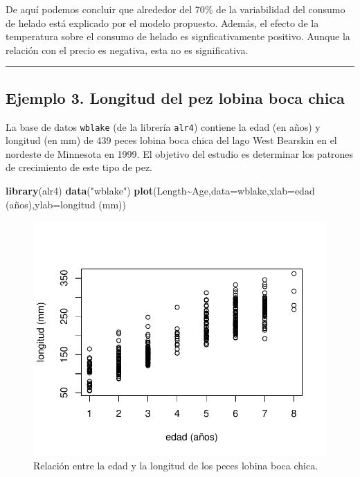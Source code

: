 \documentclass[
]{article}
\newenvironment{Shaded}{\begin{snugshade}}{\end{snugshade}}
\newcommand{\AttributeTok}[1]{\textcolor[rgb]{0.13,0.29,0.53}{#1}}
\newcommand{\FunctionTok}[1]{\textcolor[rgb]{0.13,0.29,0.53}{\textbf{#1}}}
\newcommand{\NormalTok}[1]{#1}
\newcommand{\SpecialCharTok}[1]{\textcolor[rgb]{0.81,0.36,0.00}{\textbf{#1}}}
\newcommand{\StringTok}[1]{\textcolor[rgb]{0.31,0.60,0.02}{#1}}
\begin{document}
De aquí podemos concluir que alrededor del 70\% de la variabilidad del consumo de helado está explicado por el modelo propuesto. Además, el efecto de la temperatura sobre el consumo de helado es signficativamente positivo. Aunque la relación con el precio es negativa, esta no es significativa.

\rule{\textwidth}{0.4pt}

\hypertarget{ejemplo-3.-longitud-del-pez-lobina-boca-chica}{%
\subsection*{Ejemplo 3. Longitud del pez lobina boca chica}\label{ejemplo-3.-longitud-del-pez-lobina-boca-chica}}

La base de datos \texttt{wblake} (de la librería \texttt{alr4}) contiene la edad (en años) y longitud (en mm) de 439 peces lobina boca chica del lago West Bearskin en el nordeste de Minnesota en 1999. El objetivo del estudio es determinar los patrones de crecimiento de este tipo de pez.

\begin{Shaded}
\begin{Highlighting}[]
\FunctionTok{library}\NormalTok{(alr4)}
\FunctionTok{data}\NormalTok{(}\StringTok{"wblake"}\NormalTok{)}
\FunctionTok{plot}\NormalTok{(Length}\SpecialCharTok{\textasciitilde{}}\NormalTok{Age,}\AttributeTok{data=}\NormalTok{wblake,}\AttributeTok{xlab=}\StringTok{\textquotesingle{}edad (años)\textquotesingle{}}\NormalTok{,}\AttributeTok{ylab=}\StringTok{\textquotesingle{}longitud (mm)\textquotesingle{}}\NormalTok{)}
\end{Highlighting}
\end{Shaded}

\begin{figure}

{\centering \includegraphics{MLG1_files/figure-latex/bassFig-1} 

}

\caption{\label{fig:bass} Relación entre la edad y la longitud de los peces lobina boca chica.}\label{fig:bassFig}
\end{figure}
\end{document}
